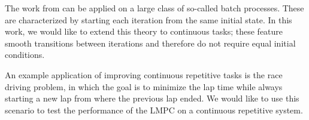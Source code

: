 The work from \cite{Rosolia2016} can be applied on a large class of so-called batch processes. These are characterized by starting each iteration from the same initial state. In this work, we would like to extend this theory to continuous tasks; these feature smooth transitions between iterations and therefore do not require equal initial conditions.

An example application of improving continuous repetitive tasks is the race driving problem, in which the goal is to minimize the lap time while always starting a new lap from where the previous lap ended. We would like to use this scenario to test the performance of the LMPC on a continuous repetitive system.

